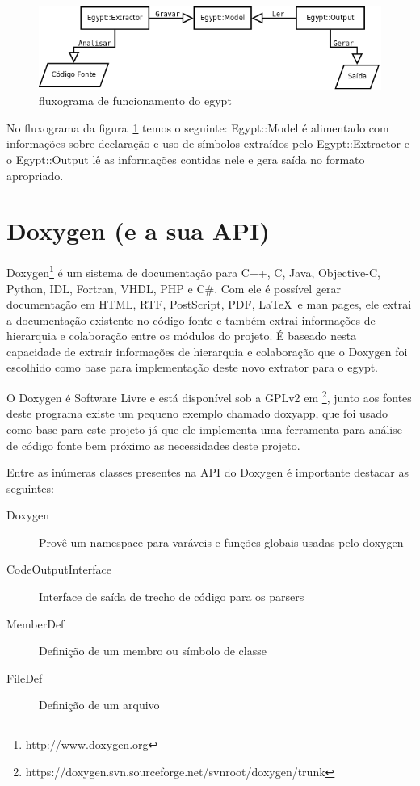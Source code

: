 \begin{figure}[h]
\center
\includegraphics[scale=0.4]{imagens/egypt-fluxogram}
\caption{fluxograma de funcionamento do egypt}
\label{egypt-fluxogram}
\end{figure}

No fluxograma da figura~\ref{egypt-fluxogram} temos o seguinte: Egypt::Model é
alimentado com informações sobre declaração e uso de símbolos extraídos pelo
Egypt::Extractor e o Egypt::Output lê as informações contidas nele e gera saída
no formato apropriado.

\section{Doxygen (e a sua API)}

Doxygen\footnote{http://www.doxygen.org} é um sistema de documentação para C++,
C, Java, Objective-C, Python, IDL, Fortran, VHDL, PHP e C\#. Com ele é possível
gerar documentação em HTML, RTF, PostScript, PDF, \LaTeX\ e man pages, ele
extrai a documentação existente no código fonte e também extrai informações de
hierarquia e colaboração entre os módulos do projeto. É baseado nesta
capacidade de extrair informações de hierarquia e colaboração que o Doxygen foi
escolhido como base para implementação deste novo extrator para o egypt.

O Doxygen é Software Livre e está disponível sob a GPLv2 em
\footnote{https://doxygen.svn.sourceforge.net/svnroot/doxygen/trunk}, junto aos
fontes deste programa existe um pequeno exemplo chamado doxyapp, que foi usado
como base para este projeto já que ele implementa uma ferramenta para análise
de código fonte bem próximo as necessidades deste projeto.

Entre as inúmeras classes presentes na API do Doxygen é importante
destacar as seguintes:

\begin{description}
\item[Doxygen] Provê um namespace para varáveis e funções globais usadas pelo doxygen
\item[CodeOutputInterface] Interface de saída de trecho de código para os parsers
\item[MemberDef] Definição de um membro ou símbolo de classe
\item[FileDef] Definição de um arquivo
\end{description}

